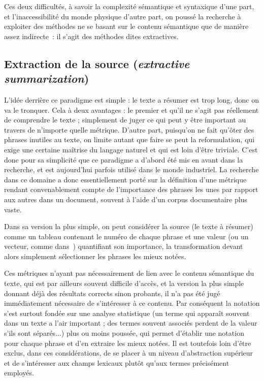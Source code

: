 \documentclass[a4paper, 12pt]{article}
\begin{document}
Ces deux difficultés, à savoir la complexité sémantique et syntaxique d'une part, et l'inaccessibilité du monde physique d'autre part, on poussé la recherche à exploiter des méthodes ne se basant sur le contenu sémantique que de manière assez indirecte~: il s'agit des méthodes dites extractives.


\subsection{Extraction de la source (\emph{extractive summarization})}

L'idée derrière ce paradigme est simple : le texte a résumer est trop long, donc on va le tronquer. Cela à deux avantages : le premier et qu'il ne s'agit pas réellement de comprendre le texte ; simplement de juger ce qui peut y être important au travers de n'importe quelle métrique. D'autre part, puisqu'on ne fait qu'ôter des phrases inutiles au texte, on limite autant que faire se peut la reformulation, qui exige une certaine maîtrise du langage naturel et qui est loin d'être triviale. C'est donc pour sa simplicité que ce paradigme a d'abord été mis en avant dans la recherche, et est aujourd'hui parfois utilisé dans le monde industriel. La recherche dans ce domaine a donc essentiellement porté sur la définition d'une métrique rendant convenablement compte de l'importance des phrases les unes par rapport aux autres dans un document, souvent à l'aide d'un corpus documentaire plus vaste.

Dans sa version la plus simple, on peut considérer la source (le texte à résumer) comme un tableau contenant le numéro de chaque phrase et une valeur (ou un vecteur, comme dans~\cite{fattah_ga_2009}) quantifiant son importance, la transformation devant alors simplement sélectionner les phrases les mieux notées. 

Ces métriques n'ayant pas nécessairement de lien avec le contenu sémantique du texte, qui est par ailleurs souvent difficile d'accès, et la version la plus simple donnant déjà des résultats corrects sinon probants, il n'a pas été jugé immédiatement nécessaire de s'intéresser à ce contenu. Par conséquent la notation s'est surtout fondée sur une analyse statistique (un terme qui apparaît souvent dans un texte a l'air important ; des termes souvent associés perdent de la valeur s'ils sont séparés...) plus ou moins poussée, qui permet d'établir une notation pour chaque phrase et d'en extraire les mieux notées. Il est toutefois loin d'être exclus, dans ces considérations, de se placer à un niveau d'abstraction supérieur et de s'intéresser aux champs lexicaux plutôt qu'aux termes précisément employés.
\end{document}
